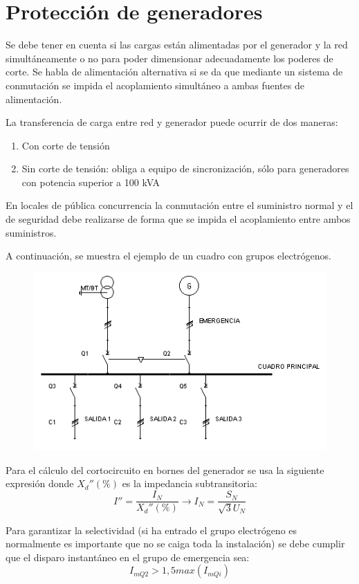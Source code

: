 \section{Protección de generadores}
Se debe tener en cuenta si las cargas están alimentadas por el generador y la red simultáneamente o no para poder dimensionar adecuadamente los poderes de corte. Se habla de alimentación alternativa si se da que mediante un sistema de conmutación se impida el acoplamiento simultáneo a ambas fuentes de alimentación.
\newline

La transferencia de carga entre red y generador puede ocurrir de dos maneras:
\begin{enumerate}
	\item Con corte de tensión
	\item Sin corte de tensión: obliga a equipo de sincronización, sólo para generadores con potencia superior a 100 kVA
\end{enumerate}

En locales de pública concurrencia la conmutación entre el suministro normal y el de seguridad debe realizarse de forma que se impida el acoplamiento entre ambos suministros.
\newline

A continuación, se muestra el ejemplo de un cuadro con grupos electrógenos.
\begin{figure}[H]
	\centering
	\includegraphics[width=0.7\linewidth]{Images/21}
\end{figure}

Para el cálculo del cortocircuito en bornes del generador se usa la siguiente expresión donde $ X_d''(\%)$ es la impedancia subtransitoria:
\begin{equation}
	I''=\dfrac{I_N}{X_d''(\%)} \rightarrow I_N=\dfrac{S_N}{\sqrt{3}U_N}
\end{equation}

Para garantizar la selectividad (si ha entrado el grupo electrógeno es normalmente es importante que no se caiga toda la instalación) se debe cumplir que el disparo instantáneo en el grupo de emergencia sea:
\begin{equation}
	I_{mQ2}> 1,5 max(I_{mQi})
\end{equation}

